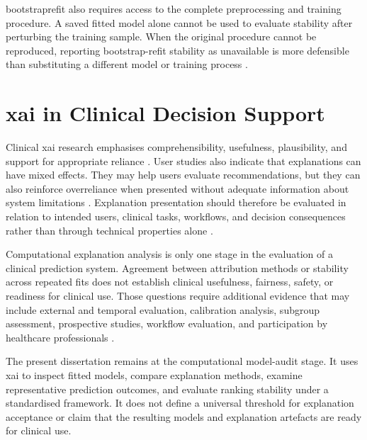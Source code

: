 \Gls{bootstraprefit} also requires access to the complete preprocessing and training procedure. A saved fitted model alone cannot be used to evaluate stability after perturbing the training sample. When the original procedure cannot be reproduced, reporting bootstrap-refit stability as unavailable is more defensible than substituting a different model or training process \citep{collins_tripodai_2024, canha_functionally-grounded_2025}.

\section{\gls{xai} in Clinical Decision Support}

Clinical \gls{xai} research emphasises comprehensibility, usefulness, plausibility, and support for appropriate reliance \citep{barredo_arrieta_explainable_2020, mohseni_multidisciplinary_2021}. User studies also indicate that explanations can have mixed effects. They may help users evaluate recommendations, but they can also reinforce overreliance when presented without adequate information about system limitations \citep{vasconcelos_explanations_2023, lee_understanding_2023}. Explanation presentation should therefore be evaluated in relation to intended users, clinical tasks, workflows, and decision consequences rather than through technical properties alone \citep{panigutti_co-design_2023, vasey_decideai_2022}.

Computational explanation analysis is only one stage in the evaluation of a clinical prediction system. Agreement between attribution methods or stability across repeated fits does not establish clinical usefulness, fairness, safety, or readiness for clinical use. Those questions require additional evidence that may include external and temporal evaluation, calibration analysis, subgroup assessment, prospective studies, workflow evaluation, and participation by healthcare professionals \citep{collins_tripodai_2024, moons_probastai_2025, van_calster_calibration_2019, vasey_decideai_2022, panigutti_co-design_2023}.

The present dissertation remains at the computational model-audit stage. It uses \gls{xai} to inspect fitted models, compare explanation methods, examine representative prediction outcomes, and evaluate ranking stability under a standardised framework. It does not define a universal threshold for explanation acceptance or claim that the resulting models and explanation artefacts are ready for clinical use.

